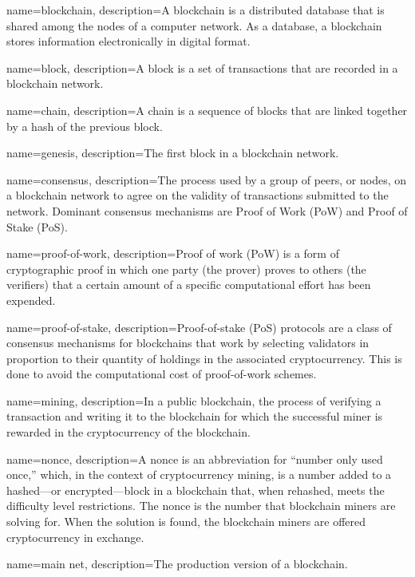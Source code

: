  {
	name=blockchain,
	description={A blockchain is a distributed database that is shared among the nodes of a computer network. As a database, a blockchain stores information electronically in digital format.}
}

 {
	name=block,
	description={A block is a set of transactions that are recorded in a blockchain network.}
}

 {
	name=chain,
	description={A chain is a sequence of blocks that are linked together by a hash of the previous block.}
}

 {
	name=genesis,
	description={The first block in a blockchain network.}
}

 {
	name=consensus,
	description={The process used by a group of peers, or nodes, on a blockchain network to agree on the validity of transactions submitted to the network. Dominant consensus mechanisms are Proof of Work (PoW) and Proof of Stake (PoS).}
}

 {
	name=proof-of-work,
	description={Proof of work (PoW) is a form of cryptographic proof in which one party (the prover) proves to others (the verifiers) that a certain amount of a specific computational effort has been expended.}
}

 {
	name=proof-of-stake,
	description={Proof-of-stake (PoS) protocols are a class of consensus mechanisms for blockchains that work by selecting validators in proportion to their quantity of holdings in the associated cryptocurrency. This is done to avoid the computational cost of proof-of-work schemes.}
}

 {
	name=mining,
	description={In a public blockchain, the process of verifying a transaction and writing it to the blockchain for which the successful miner is rewarded in the cryptocurrency of the blockchain.}
}

 {
	name=nonce,
	description={A nonce is an abbreviation for ``number only used once,'' which, in the context of cryptocurrency mining, is a number added to a hashed—or encrypted—block in a blockchain that, when rehashed, meets the difficulty level restrictions. The nonce is the number that blockchain miners are solving for. When the solution is found, the blockchain miners are offered cryptocurrency in exchange.}
}

 {
	name=main net,
	description={The production version of a blockchain.}
}

